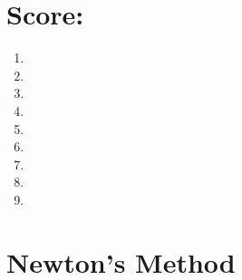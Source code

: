 \vspace{1em}

\section*{Score:  \scoreMark}
\vspace{1em}
\begin{large}
\begin{multicols}{2}
\begin{enumerate}  \setlength\itemsep{1.1em} \setlength\itemindent{36pt}
\item \scoreMark
\item \scoreMark
\item \scoreMark
\item \scoreMark
\item \scoreMark
\item \scoreMark
\item \scoreMark
\item \scoreMark
\item \scoreMark
\end{enumerate}
\end{multicols}
\end{large}


\renewcommand{\theenumi}{\Alph{enumi}}


\pagebreak
\section{Newton's Method}

